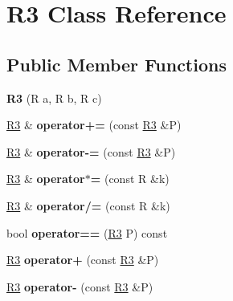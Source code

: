 \hypertarget{class_r3}{}\section{R3 Class Reference}
\label{class_r3}
\subsection*{Public Member Functions}
\begin{DoxyCompactItemize}
\item 
{\bfseries R3} (R a, R b, R c)\hypertarget{class_r3_a37b08c627f9b80d28ef1b529d6c9393b}{}\label{class_r3_a37b08c627f9b80d28ef1b529d6c9393b}

\item 
\hyperlink{class_r3}{R3} \& {\bfseries operator+=} (const \hyperlink{class_r3}{R3} \&P)\hypertarget{class_r3_a7f8e93ee1556118d90955876f6680957}{}\label{class_r3_a7f8e93ee1556118d90955876f6680957}

\item 
\hyperlink{class_r3}{R3} \& {\bfseries operator-\/=} (const \hyperlink{class_r3}{R3} \&P)\hypertarget{class_r3_abb52da4099c6b0445da9328c734fca6d}{}\label{class_r3_abb52da4099c6b0445da9328c734fca6d}

\item 
\hyperlink{class_r3}{R3} \& {\bfseries operator$\ast$=} (const R \&k)\hypertarget{class_r3_af9c0985c2d02906c730bc704bda10c4d}{}\label{class_r3_af9c0985c2d02906c730bc704bda10c4d}

\item 
\hyperlink{class_r3}{R3} \& {\bfseries operator/=} (const R \&k)\hypertarget{class_r3_aec241319b6fb3190bbacabb54654b151}{}\label{class_r3_aec241319b6fb3190bbacabb54654b151}

\item 
bool {\bfseries operator==} (\hyperlink{class_r3}{R3} P) const \hypertarget{class_r3_a65a27d5d32de6e120671ac59a9cb9eaa}{}\label{class_r3_a65a27d5d32de6e120671ac59a9cb9eaa}

\item 
\hyperlink{class_r3}{R3} {\bfseries operator+} (const \hyperlink{class_r3}{R3} \&P)\hypertarget{class_r3_aff923bf7190c24b2b678addc5c8a71d7}{}\label{class_r3_aff923bf7190c24b2b678addc5c8a71d7}

\item 
\hyperlink{class_r3}{R3} {\bfseries operator-\/} (const \hyperlink{class_r3}{R3} \&P)\hypertarget{class_r3_aefd70a29754d71c1488a58500e7d0c07}{}\label{class_r3_aefd70a29754d71c1488a58500e7d0c07}


\end{DoxyCompactItemize}
